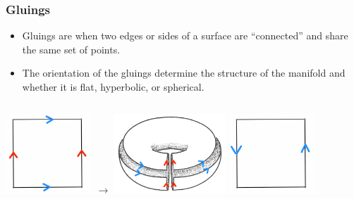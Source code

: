 \documentclass[13pt]{beamer}
\begin{document}
\begin{frame}
\frametitle{Gluings}
	\begin{itemize}
    \item \alert{Gluings} are when two edges or sides of a surface are ``connected'' and share the same set of points.
		\item The orientation of the gluings determine the structure of the manifold and whether it is flat, hyperbolic, or spherical.
	\end{itemize}

  \begin{columns}[r] %
     \centering
      \includegraphics[height=3cm]{./img/torusgluing} $\rightarrow$
     \centering
     \includegraphics[height=3cm]{./img/torusconstruction}
     \centering
      \includegraphics[height=3cm]{./img/mobiusgluing}
  \end{columns}
\end{frame}
\end{document}
